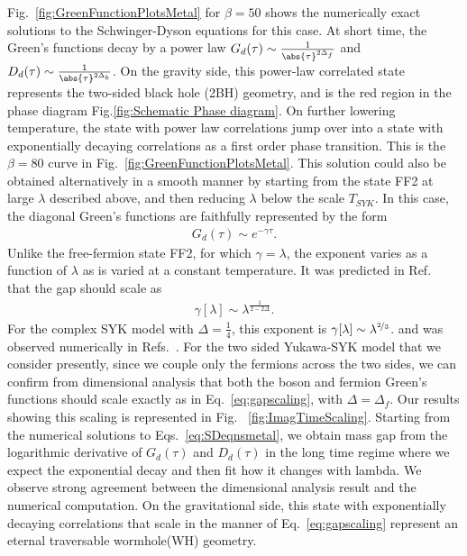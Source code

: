 Fig.~\ref{fig:GreenFunctionPlotsMetal} for $\beta=50$ shows the numerically exact solutions to the Schwinger-Dyson equations for this case. At short time, the Green's functions decay by a power law $G_d(\tau) \sim \frac{1}{\abs{\tau}^{2\Delta_f}}$ and $D_d(\tau) \sim \frac{1}{\abs{\tau}^{2\Delta_b}}$. 
On the gravity side, this power-law correlated state represents the two-sided black hole (2BH) geometry, and is the red region in the phase diagram Fig.\ref{fig:Schematic Phase diagram}.
%
On further lowering temperature, the state with power law correlations jump over into a state with exponentially decaying correlations as a first order phase transition. This is the $\beta=80$ curve in Fig.~\ref{fig:GreenFunctionPlotsMetal}. This solution could also be obtained alternatively in a smooth manner by starting from the state FF2 at large $\lambda$ described above, and then reducing $\lambda$ below the scale $T_{SYK}$. 
In this case, the diagonal Green's functions are faithfully represented by the form 
\begin{align}
    G_d(\tau) \sim e^{-\gamma \tau}. 
\end{align}
Unlike the free-fermion state FF2, for which $\gamma = \lambda$, the exponent varies as a function of $\lambda$ as is varied at a constant temperature. It was predicted in Ref.~\cite{maldacena2018eternal} that the gap should scale as 
\begin{align}
    \gamma[\lambda] \sim \lambda^{\frac{1}{2-2\Delta}}. 
    \label{eq:gapscaling}
\end{align}
For the complex SYK model with $\Delta=\frac{1}{4}$, this exponent is $\gamma[\lambda] \sim \lambda^{\nicefrac{2}{3}}$. and was observed numerically in Refs.~\cite{maldacena2018eternal,qi2020coupled,sahoo2020traversable}. 
%
For the two sided Yukawa-SYK model that we consider presently, since we couple only the fermions across the two sides, we can confirm from dimensional analysis that both the boson and fermion Green's functions should scale exactly as in Eq.~\eqref{eq:gapscaling}, with $\Delta = \Delta_f$. Our results showing this scaling is represented in Fig. ~\ref{fig:ImagTimeScaling}. Starting from the numerical solutions to Eqs.~\ref{eq:SDeqnsmetal}, we obtain mass gap from the logarithmic derivative of $G_d(\tau)$ and $D_d(\tau)$ in the long time regime where we expect the exponential decay and then fit how it changes with lambda. We observe strong agreement between the dimensional analysis result and the numerical computation.  
%
On the gravitational side, this state with exponentially decaying correlations that scale in the manner of Eq.~\eqref{eq:gapscaling} represent an eternal traversable wormhole(WH) geometry. 
